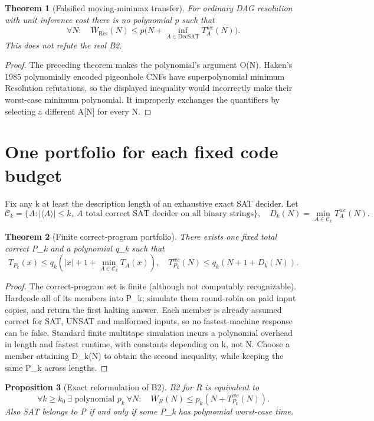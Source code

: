 \documentclass[11pt]{article}
\newtheorem{theorem}{Theorem}
\newtheorem{proposition}[theorem]{Proposition}
\begin{document}
\begin{theorem}[Falsified moving-minimax transfer]
For ordinary DAG resolution with unit inference cost there is no polynomial p such that
\[
\forall N:\quad\overline W_{\mathrm{Res}}(N)\le p\bigl(N+\inf_{A\in\mathrm{DecSAT}}T_A^{wc}(N)\bigr).
\]
This does not refute the real B2.
\end{theorem}
\begin{proof}
The preceding theorem makes the polynomial's argument O(N). Haken's 1985 polynomially encoded pigeonhole CNFs have superpolynomial minimum Resolution refutations, so the displayed inequality would incorrectly make their worst-case minimum polynomial. It improperly exchanges the quantifiers by selecting a different A[N] for every N.
\end{proof}
\section{One portfolio for each fixed code budget}
Fix any k at least the description length of an exhaustive exact SAT decider. Let
\[
\mathcal C_k=\{A:|\langle A\rangle|\le k,\ A\text{ total correct SAT decider on all binary strings}\},\quad D_k(N)=\min_{A\in\mathcal C_k}T_A^{wc}(N).
\]
\begin{theorem}[Finite correct-program portfolio]
There exists one fixed total correct P_k and a polynomial q_k such that
\[
T_{P_k}(x)\le q_k\left(|x|+1+\min_{A\in\mathcal C_k}T_A(x)\right),\quad
T_{P_k}^{wc}(N)\le q_k(N+1+D_k(N)).
\]
\end{theorem}
\begin{proof}
The correct-program set is finite (although not computably recognizable). Hardcode all of its members into P_k; simulate them round-robin on paid input copies, and return the first halting answer. Each member is already assumed correct for SAT, UNSAT and malformed inputs, so no fastest-machine response can be false. Standard finite multitape simulation incurs a polynomial overhead in length and fastest runtime, with constants depending on k, not N. Choose a member attaining D_k(N) to obtain the second inequality, while keeping the same P_k across lengths.
\end{proof}
\begin{proposition}[Exact reformulation of B2]
B2 for R is equivalent to
\[
\forall k\ge k_0\ \exists\text{ polynomial }p_k\ \forall N:\quad
\overline W_R(N)\le p_k(N+T_{P_k}^{wc}(N)).
\]
Also SAT belongs to P if and only if some P_k has polynomial worst-case time.
\end{proposition}
\end{document}
